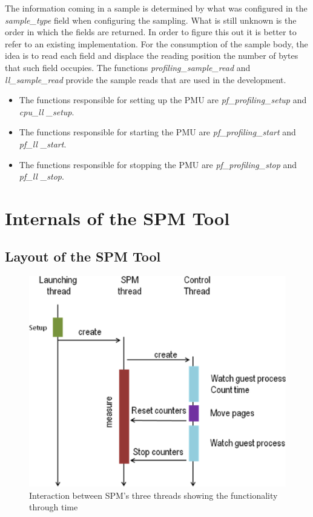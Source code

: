 The information coming in a sample is determined by what was configured in the \textit{sample\_type} field when configuring the sampling. What is still unknown is the order in which the fields are returned. In order to figure this out it is better to refer to an existing implementation. For the consumption of the sample body, the idea is to read each field and displace the reading position the number of bytes that such field occupies. The functions \textit{profiling\_sample\_read} and \textit{ll\_sample\_read} provide the sample reads that are used in the development. 


\begin{itemize}
	\item The functions responsible for setting up the PMU are \textit{pf\_profiling\_setup} and \textit{cpu\_ll \_setup}.
	\item The functions responsible for starting the PMU are \textit{pf\_profiling\_start} and \textit{pf\_ll \_start}. 
	\item The functions responsible for stopping the PMU are \textit{pf\_profiling\_stop} and \textit{pf\_ll \_stop}.
\end{itemize}
  
\section{Internals of the SPM Tool}\label{section:spminternals}

\subsection{Layout of the SPM Tool }\label{subsection:main-layout}
\begin{figure}[h]
	\centering
		\includegraphics[width=.9\textwidth]{figures/sequence.eps}
		\caption[Timing and threads in the execution of the SPM tool]{Interaction between SPM's three threads showing the functionality through time}
		\label{fig:sol-seq}
\end{figure}

